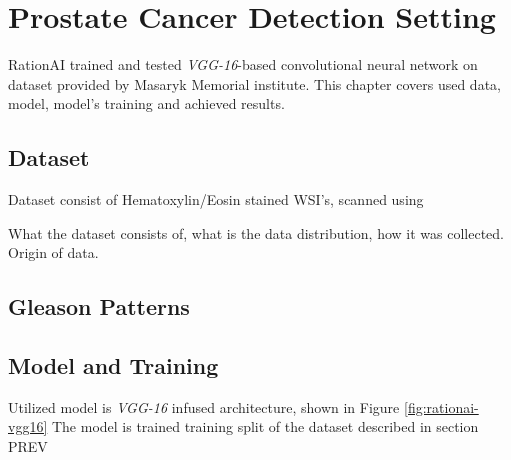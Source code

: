 \chapter{Prostate Cancer Detection Setting}

RationAI trained and tested \emph{VGG-16}-based convolutional neural network on dataset provided by Masaryk Memorial institute. This chapter covers used data, model, model's training and achieved results.

\section{Dataset}

Dataset consist of Hematoxylin/Eosin stained WSI's, scanned using

What the dataset consists of, what is the data distribution, how it was collected. Origin of data.

\section{Gleason Patterns}

\section{Model and Training}

Utilized model is \emph{VGG-16} infused architecture, shown in Figure \ref{fig:rationai-vgg16} The model is trained training split of the dataset described in section PREV

